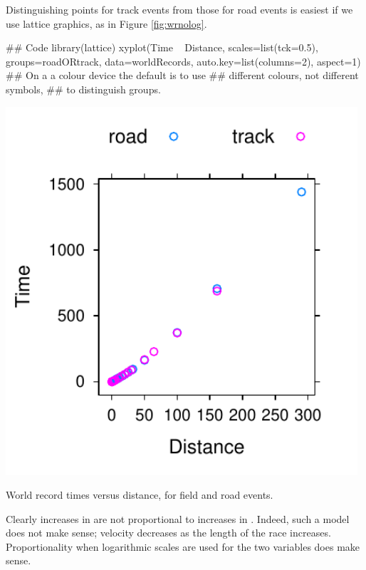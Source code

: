 Distinguishing points for track events from those for road events is
easiest if we use lattice graphics, as in Figure \ref{fig:wrnolog}.

\begin{Schunk}
\begin{Sinput}
## Code
library(lattice)
xyplot(Time ~ Distance, scales=list(tck=0.5),
       groups=roadORtrack, data=worldRecords,
       auto.key=list(columns=2), aspect=1)
## On a a colour device the default is to use
## different colours, not different symbols,
## to distinguish groups.
\end{Sinput}
\end{Schunk}

\begin{marginfigure}
\begin{Schunk}


\centerline{\includegraphics[width=0.98\textwidth]{figs/03-trackVSroad-1} }

\end{Schunk}
\caption{World record times versus distance, for field and road
  events.\label{fig:wrnolog}}
\end{marginfigure}

Clearly increases in  are not proportional to increases in
.  Indeed, such a model does not make sense; velocity
decreases as the length of the race increases.  Proportionality when
logarithmic scales are used for the two variables does make sense.

